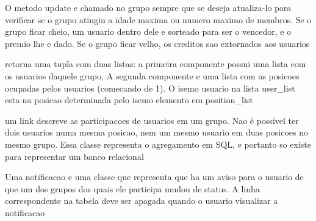 \documentclass[letterpaper,10pt,english]{sphinxmanual}
\begin{document}
\begin{fulllineitems}

\begin{fulllineitems}
\label{modules/models:ubet.models.Group.update}
O metodo update e chamado no grupo sempre que se deseja atualiza-lo 
para verificar se o grupo atingiu a idade maxima ou numero maximo de membros.
Se o grupo ficar cheio, um usuario dentro dele e sorteado para ser o vencedor, e o
premio lhe e dado. 
Se o grupo ficar velho, os creditos sao extornados aos usuarios

\end{fulllineitems}


\begin{fulllineitems}
\label{modules/models:ubet.models.Group.users_by_group}
retorna uma tupla com duas listas: a primeira componente possui uma lista 
com os usuarios daquele grupo. A segunda componente e uma lista com as posicoes ocupadas 
pelos usuarios (comecando de 1). O isemo usuario na lista user\_list esta na posicao
determinada pelo isemo elemento em position\_list

\end{fulllineitems}


\end{fulllineitems}


\begin{fulllineitems}
\label{modules/models:ubet.models.Group_link}
um link descreve as participacoes de usuarios em um grupo. Nao é possivel ter
dois usuarios numa mesma posicao, nem um mesmo usuario em duas posicoes no mesmo grupo.
Essa classe representa o agregamento em SQL, e portanto so existe para representar 
um banco relacional

\end{fulllineitems}


\begin{fulllineitems}
\label{modules/models:ubet.models.Notification}
Uma notificacao e uma classe que representa que ha um aviso para o usuario de que
um dos grupos dos quais ele participa mudou de status. A linha correspondente na tabela
deve ser apagada quando o usuario visualizar a notificacao

\end{fulllineitems}
\end{document}
